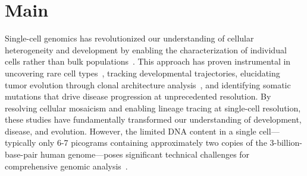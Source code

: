 \documentclass[pdflatex,sn-nature,lineno]{sn-jnl}%
\theoremstyle{thmstyleone}%
\theoremstyle{thmstyletwo}%
\theoremstyle{thmstylethree}%
\begin{document}
\maketitle

\section*{Main}\label{sec:main}

Single-cell genomics has revolutionized our understanding of cellular heterogeneity and development by enabling the characterization of individual cells rather than bulk populations~\cite{kalef2024single,sun2024mapping,navin2011tumour,macaulay2014single}.
This approach has proven instrumental in uncovering rare cell types~\cite{macaulay2014single}, tracking developmental trajectories, elucidating tumor evolution through clonal architecture analysis~\cite{navin2011tumour}, and identifying somatic mutations that drive disease progression at unprecedented resolution.
By resolving cellular mosaicism and enabling lineage tracing at single-cell resolution, these studies have fundamentally transformed our understanding of development, disease, and evolution.
However, the limited DNA content in a single cell—typically only 6-7 picograms containing approximately two copies of the 3-billion-base-pair human genome—poses significant technical challenges for comprehensive genomic analysis~\cite{leung2016highly,gawad2016single,chen2017singlecell}.
\end{document}
